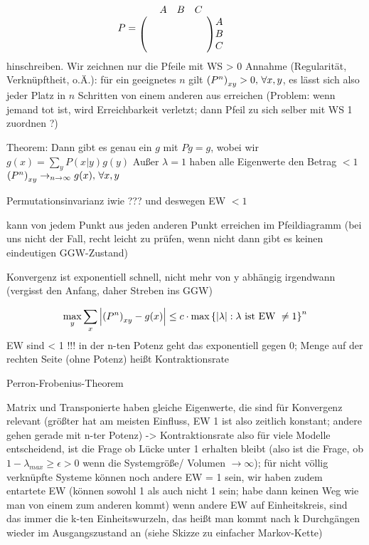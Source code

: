 \begin{equation*}\label{key}
P = \mqty{ 
	\mqty{ A & B & C} & \rule{20pt}{0pt}
	\\
	\mqty(
		\rule{10pt}{0pt} & \rule{10pt}{0pt} & \rule{20pt}{0pt}
		\\
		\rule{10pt}{0pt} & \rule{10pt}{0pt} & \rule{20pt}{0pt}
		\\
		\rule{10pt}{0pt} & \rule{10pt}{0pt} & \rule{20pt}{0pt}
	) 
	\mqty{ A \\ B \\ C}}
\end{equation*}
hinschreiben.
Wir zeichnen nur die Pfeile mit WS > 0
Annahme (Regularität, Verknüpftheit, o.Ä.): für ein geeignetes $n$ gilt $\qty(P^n)_{xy} > 0, \, \forall x,y$, es lässt sich also jeder Platz in $n$ Schritten von einem anderen aus erreichen (Problem: wenn jemand tot ist, wird Erreichbarkeit verletzt; dann Pfeil zu sich selber mit WS 1 zuordnen ?)

Theorem: Dann gibt es genau ein $g$ mit $Pg = g$, wobei wir $g(x) = \sum\limits_y P(x|y) g(y)$
Außer $\lambda = 1$ haben alle Eigenwerte den Betrag $< 1$
$\qty(P^n)_{xy} \rightarrow_{n\rightarrow \infty} g(x), \, \forall x,y$

Permutationsinvarianz iwie ??? und deswegen EW $< 1$



kann von jedem Punkt aus jeden anderen Punkt erreichen im Pfeildiagramm (bei uns nicht der Fall, recht leicht zu prüfen, wenn nicht dann gibt es keinen eindeutigen GGW-Zustand)

Konvergenz ist exponentiell schnell, nicht mehr von y abhängig irgendwann (vergisst den Anfang, daher Streben ins GGW)

\begin{equation}\label{key}
\max_y \sum\limits_x \abs{ \qty(P^n)_{xy} - g(x) } \leq c \cdot \max\qty{\abs{\lambda}: \lambda \text{ ist EW }\neq 1}^n
\end{equation}
EW sind < 1 !!! in der n-ten Potenz geht das exponentiell gegen 0; Menge auf der rechten Seite (ohne Potenz) heißt Kontraktionsrate

Perron-Frobenius-Theorem

Matrix und Transponierte haben gleiche Eigenwerte, die sind für Konvergenz relevant (größter hat am meisten Einfluss, EW 1 ist also zeitlich konstant; andere gehen gerade mit n-ter Potenz)
-> Kontraktionsrate also für viele Modelle entscheidend, ist die Frage ob Lücke unter 1 erhalten bleibt (also ist die Frage, ob $1 - \lambda_{max} \geq \epsilon > 0$ wenn die Systemgröße/ Volumen $\rightarrow \infty$); für nicht völlig verknüpfte Systeme können noch andere EW = 1 sein, wir haben zudem entartete EW (können sowohl 1 als auch nicht 1 sein; habe dann keinen Weg wie man von einem zum anderen kommt)
wenn andere EW auf Einheitskreis, sind das immer die k-ten Einheitswurzeln, das heißt man kommt nach k Durchgängen wieder im Ausgangszustand an (siehe Skizze zu einfacher Markov-Kette)


